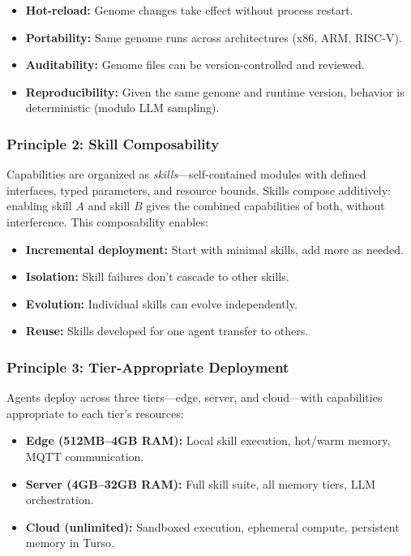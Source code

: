 \documentclass{article}
\begin{document}
\begin{itemize}[leftmargin=*]
    \item \textbf{Hot-reload:} Genome changes take effect without process restart.
    \item \textbf{Portability:} Same genome runs across architectures (x86, ARM, RISC-V).
    \item \textbf{Auditability:} Genome files can be version-controlled and reviewed.
    \item \textbf{Reproducibility:} Given the same genome and runtime version, behavior is deterministic (modulo LLM sampling).
\end{itemize}

\subsubsection{Principle 2: Skill Composability}

Capabilities are organized as \textit{skills}—self-contained modules with defined interfaces, typed parameters, and resource bounds. Skills compose additively: enabling skill $A$ and skill $B$ gives the combined capabilities of both, without interference. This composability enables:

\begin{itemize}[leftmargin=*]
    \item \textbf{Incremental deployment:} Start with minimal skills, add more as needed.
    \item \textbf{Isolation:} Skill failures don't cascade to other skills.
    \item \textbf{Evolution:} Individual skills can evolve independently.
    \item \textbf{Reuse:} Skills developed for one agent transfer to others.
\end{itemize}

\subsubsection{Principle 3: Tier-Appropriate Deployment}

Agents deploy across three tiers—edge, server, and cloud—with capabilities appropriate to each tier's resources:

\begin{itemize}[leftmargin=*]
    \item \textbf{Edge (512MB--4GB RAM):} Local skill execution, hot/warm memory, MQTT communication.
    \item \textbf{Server (4GB--32GB RAM):} Full skill suite, all memory tiers, LLM orchestration.
    \item \textbf{Cloud (unlimited):} Sandboxed execution, ephemeral compute, persistent memory in Turso.
\end{itemize}
\end{document}
